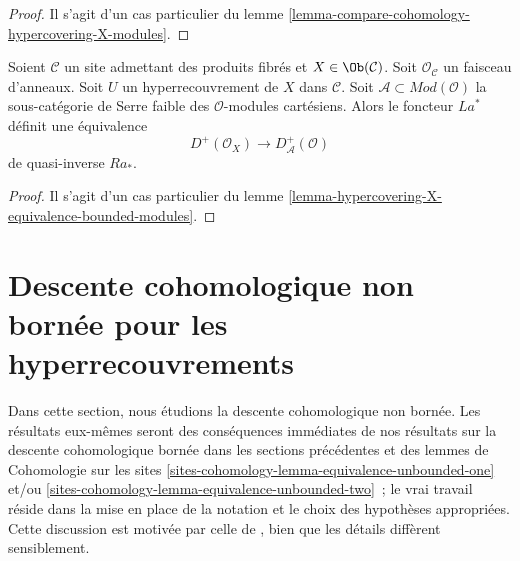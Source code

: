 \begin{proof}
Il s'agit d'un cas particulier du lemme
\ref{lemma-compare-cohomology-hypercovering-X-modules}.
\end{proof}

\begin{lemma}
\label{lemma-hypercovering-X-simple-equivalence-bounded-modules}
Soient $\mathcal{C}$ un site admettant des produits fibrés et $X \in \Ob(\mathcal{C})$.
Soit $\mathcal{O}_\mathcal{C}$ un faisceau d'anneaux.
Soit $U$ un hyperrecouvrement de $X$ dans $\mathcal{C}$.
Soit $\mathcal{A} \subset \textit{Mod}(\mathcal{O})$
la sous-catégorie de Serre faible des $\mathcal{O}$-modules cartésiens.
Alors le foncteur $La^*$ définit une équivalence
$$
D^+(\mathcal{O}_X) \longrightarrow D_\mathcal{A}^+(\mathcal{O})
$$
de quasi-inverse $Ra_*$.
\end{lemma}

\begin{proof}
Il s'agit d'un cas particulier du lemme
\ref{lemma-hypercovering-X-equivalence-bounded-modules}.
\end{proof}







\section{Descente cohomologique non bornée pour les hyperrecouvrements}
\label{section-unbounded-cohomological-descent}

\noindent
Dans cette section, nous étudions la descente cohomologique non bornée.
Les résultats eux-mêmes seront des conséquences immédiates de
nos résultats sur la descente cohomologique bornée dans les
sections précédentes et des lemmes de Cohomologie sur les sites
\ref{sites-cohomology-lemma-equivalence-unbounded-one} et/ou
\ref{sites-cohomology-lemma-equivalence-unbounded-two} ; le vrai travail réside
dans la mise en place de la notation et le choix des hypothèses appropriées.
Cette discussion est motivée par celle de \cite{six-I},
bien que les détails diffèrent sensiblement.

